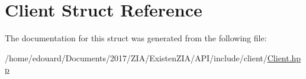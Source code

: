 \hypertarget{structClient}{}\section{Client Struct Reference}
\label{structClient}


The documentation for this struct was generated from the following file\+:\begin{DoxyCompactItemize}
\item 
/home/edouard/\+Documents/2017/\+Z\+I\+A/\+Existen\+Z\+I\+A/\+A\+P\+I/include/client/\mbox{\hyperlink{Client_8hpp}{Client.\+hpp}}\end{DoxyCompactItemize}
